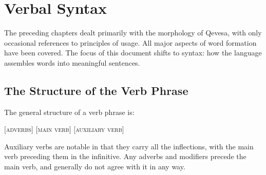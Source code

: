 \documentclass[grammar]{subfiles}
\begin{document}
\chapter{Verbal Syntax}
\label{ch:verbal_syntax}

The preceding chapters dealt primarily with the morphology of Qevesa, with
only occasional references to principles of usage. All major aspects of word
formation have been covered. The focus of this document shifts to syntax: how
the language assembles words into meaningful sentences.

%
\section{The Structure of the Verb Phrase} 
\label{sec:vp_structure}

The general structure of a verb phrase is:

\begin{exe}
  \ex \textsc{[adverbs] [main verb] [auxiliary verb]}
\end{exe}

Auxiliary verbs are notable in that they carry all the inflections, with the
main verb preceding them in the infinitive.  Any adverbs and modifiers precede
the main verb, and generally do not agree with it in any way. 

\end{document}
